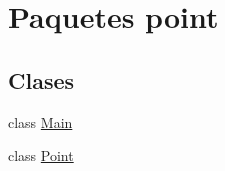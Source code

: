 \hypertarget{namespacepoint}{}\section{Paquetes point}
\label{namespacepoint}
\subsection*{Clases}
\begin{DoxyCompactItemize}
\item 
class \mbox{\hyperlink{classpoint_1_1_main}{Main}}
\item 
class \mbox{\hyperlink{classpoint_1_1_point}{Point}}
\end{DoxyCompactItemize}
